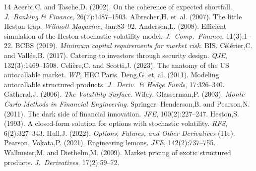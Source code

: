 \documentclass[10pt,a4paper]{article}
\begin{document}
\newpage
\begin{thebibliography}{14}
Acerbi,C. and Tasche,D. (2002). On the coherence of expected shortfall. \textit{J.\ Banking \& Finance}, 26(7):1487--1503.
Albrecher,H. et~al. (2007). The little Heston trap. \textit{Wilmott Magazine}, Jan:83--92.
Andersen,L. (2008). Efficient simulation of the Heston stochastic volatility model. \textit{J.\ Comp.\ Finance}, 11(3):1--22.
BCBS (2019). \textit{Minimum capital requirements for market risk}. BIS.
C\'el\'erier,C. and Vall\'ee,B. (2017). Catering to investors through security design. \textit{QJE}, 132(3):1469--1508.
Celi\`ere,C. and Scotti,J. (2023). The anatomy of the US autocallable market. \textit{WP}, HEC Paris.
Deng,G. et~al. (2011). Modeling autocallable structured products. \textit{J.\ Deriv.\ \& Hedge Funds}, 17:326--340.
Gatheral,J. (2006). \textit{The Volatility Surface}. Wiley.
Glasserman,P. (2003). \textit{Monte Carlo Methods in Financial Engineering}. Springer.
Henderson,B. and Pearson,N. (2011). The dark side of financial innovation. \textit{JFE}, 100(2):227--247.
Heston,S. (1993). A closed-form solution for options with stochastic volatility. \textit{RFS}, 6(2):327--343.
Hull,J. (2022). \textit{Options, Futures, and Other Derivatives} (11e). Pearson.
Vokata,P. (2021). Engineering lemons. \textit{JFE}, 142(2):737--755.
Wallmeier,M. and Diethelm,M. (2009). Market pricing of exotic structured products. \textit{J.\ Derivatives}, 17(2):59--72.
\end{thebibliography}
\end{document}
